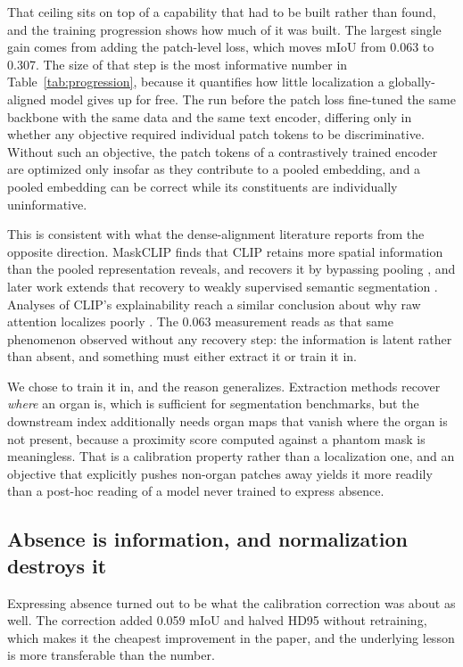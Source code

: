 That ceiling sits on top of a capability that had to be built rather than found,
and the training progression shows how much of it was built. The largest single
gain comes from adding the patch-level loss, which moves mIoU from 0.063 to
0.307. The size of that step is the most informative number in
Table~\ref{tab:progression}, because it quantifies how little localization a
globally-aligned model gives up for free. The run before the patch loss
fine-tuned the same backbone with the same data and the same text encoder,
differing only in whether any objective required individual patch tokens to be
discriminative. Without such an objective, the patch tokens of a
contrastively trained encoder are optimized only insofar as they contribute to a
pooled embedding, and a pooled embedding can be correct while its constituents
are individually uninformative.

This is consistent with what the dense-alignment literature reports from the
opposite direction. MaskCLIP finds that CLIP retains more spatial information
than the pooled representation reveals, and recovers it by bypassing pooling
\cite{zhou2022maskclip}, and later work extends that recovery to weakly
supervised semantic segmentation \cite{yang2025clipdense}. Analyses of CLIP's
explainability reach a similar conclusion about why raw attention localizes
poorly \cite{li2024clipexplain}. The 0.063 measurement reads as that same
phenomenon observed without any recovery step: the information is latent rather
than absent, and something must either extract it or train it in.

We chose to train it in, and the reason generalizes. Extraction methods recover
\emph{where} an organ is, which is sufficient for segmentation benchmarks, but
the downstream index additionally needs organ maps that vanish where the organ
is not present, because a proximity score computed against a phantom mask is
meaningless. That is a calibration property rather than a localization one, and
an objective that explicitly pushes non-organ patches away yields it more
readily than a post-hoc reading of a model never trained to express
absence.

\subsection{Absence is information, and normalization destroys it}

Expressing absence turned out to be what the calibration correction was about as
well. The correction added 0.059 mIoU and halved HD95 without retraining, which
makes it the cheapest improvement in the paper, and the underlying lesson is
more transferable than the number.

